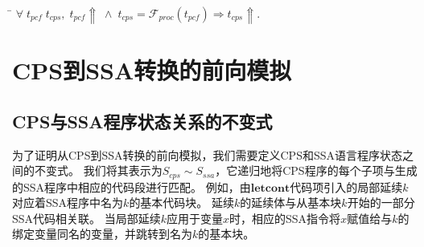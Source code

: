   \begin{theorem}[CPS程序对PCF程序发散行为的保存]\label{trm:cpsbhvpd}
    \begin{tabbing}
      \\
    \quad\=\kill
    \>$\forall \; t_{pcf}\; t_{cps},\; t_{pcf}\Uparrow\; \wedge \; t_{cps}=\mathcal{F}_{proc}(t_{pcf})\Longrightarrow t_{cps}\Uparrow.$
    \end{tabbing}
  \end{theorem}


\section{CPS到SSA转换的前向模拟} \label{sec:cpsssaforward}

\subsection{CPS与SSA程序状态关系的不变式}

为了证明从CPS到SSA转换的前向模拟，我们需要定义CPS和SSA语言程序状态之间的不变式。
我们将其表示为$S_{cps} \sim S_{ssa}$，它递归地将CPS程序的每个子项与生成的SSA程序中相应的代码段进行匹配。
例如，由$\mathbf{letcont}$代码项引入的局部延续$k$对应着SSA程序中名为$k$的基本代码块。
延续$k$的延续体与从基本块$k$开始的一部分SSA代码相关联。
当局部延续$k$应用于变量$x$时，相应的SSA指令将$x$赋值给与$k$的绑定变量同名的变量，并跳转到名为$k$的基本块。


